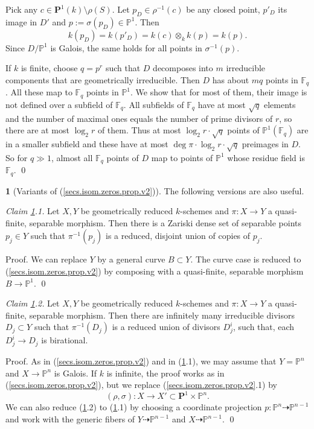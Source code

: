 \documentclass{amsart}
\theoremstyle{definition}
\newtheorem{say}[thm]{}
\theoremstyle{remark}
\newcommand{\p}[0]{{\mathbb P}}
\newcommand{\f}[0]{{\mathbb F}}
\newcommand{\map}[0]{\dasharrow}
\begin{document}
Pick any   $c\in {\mathbf P}^1(k)\setminus \rho(S)$. Let $p_D\in \rho^{-1}(c)$ be any closed point, $p'_D$ its image in $D'$ and $p:=\sigma(p_D)\in \p^1$. 
Then 
$$
k(p_D)=k(p'_D)=k(c)\otimes_k k(p)=k(p).
$$
Since $D/\p^1$ is Galois, the same holds for all points in
$\sigma^{-1}(p)$. 

If $k$ is finite, choose $q=p^r$ such that $D$ decomposes into $m$ 
irreducible components that are geometrically  irreducible.
Then $D$ has  about $mq$ points in $\f_q$.  All these map to
$\f_q$ points in $\p^1$. We show that for most of them, their image is not  defined over a subfield of $\f_q$. All subfields of $\f_q$ have at most $\sqrt{q}$ elements and the number of maximal ones equals the  number of prime divisors of  $r$, so there are at most $\log_2 r$ of them.
Thus at most $\log_2 r \cdot \sqrt{q} $ points of $\p^1(\f_q)$ are in a smaller subfield and these have at most $\deg \pi\cdot \log_2 r \cdot \sqrt{q} $
preimages in $D$. So for $q\gg 1$, almost all $\f_q$ points of $D$ map to points of $\p^1$ whose residue field is $\f_q$. \qed



\begin{say}[Variants of  (\ref{secs.isom.zeros.prop.v2})] \label{secs.isom.zeros.prop.v2.var}  The following versions are also useful.
\medskip

{\it Claim \ref{secs.isom.zeros.prop.v2.var}.1.} Let  $X, Y$  be  geometrically reduced $k$-schemes
and $\pi:X\to Y$ a quasi-finite, separable  morphism. Then there is a Zariski dense set of  separable points $p_j\in Y$ such that 
 $\pi^{-1}(p_j)$ is a reduced, disjoint union of  copies of $p_j$.
\medskip

Proof. We can  replace $Y$ by a general curve $B\subset Y$.  The curve case is reduced to  (\ref{secs.isom.zeros.prop.v2})  by composing with a  quasi-finite, separable  morphism  $B\to \p^1$. \qed


\medskip


{\it Claim \ref{secs.isom.zeros.prop.v2.var}.2.} 
Let  $X, Y$  be  geometrically reduced $k$-schemes
and $\pi:X\to Y$ a quasi-finite, separable  morphism. 
Then there are infinitely  many irreducible  divisors  $D_j\subset Y$ such that 
 $\pi^{-1}(D_j)$ is a reduced union of  divisors $D_j^i$, such that, each
$D_j^i\to D_j$ is birational. 
\medskip

Proof.  As in (\ref{secs.isom.zeros.prop.v2}) and in (\ref{secs.isom.zeros.prop.v2.var}.1), we may assume that
$Y=\p^n$ and $X\to \p^n$ is Galois.
 If $k$ is infinite,
the proof works as in (\ref{secs.isom.zeros.prop.v2}),  but we replace (\ref{secs.isom.zeros.prop.v2}.1) by
$$
(\rho, \sigma): X\to  X'\subset {\mathbf P}^1\times \p^n. 
$$
We can also reduce (\ref{secs.isom.zeros.prop.v2.var}.2) to
(\ref{secs.isom.zeros.prop.v2.var}.1) by choosing a coordinate projection
$p:\p^n\map \p^{n-1}$ and work with the generic fibers of $Y\map \p^{n-1}$ and
$X\map \p^{n-1}$. \qed
\end{say}
\end{document}
